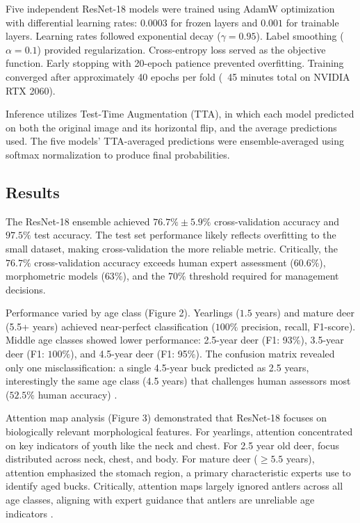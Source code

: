 \documentclass{iopjournal}
\begin{document}
Five independent ResNet-18 models were trained using AdamW optimization with differential learning rates: $0.0003$ for frozen layers and $0.001$ for trainable layers. Learning rates followed exponential decay ($\gamma=0.95$). Label smoothing ($\alpha=0.1$) provided regularization. Cross-entropy loss served as the objective function. Early stopping with 20-epoch patience prevented overfitting. Training converged after approximately 40 epochs per fold (~45 minutes total on NVIDIA RTX 2060).

Inference utilizes Test-Time Augmentation (TTA), in which each model predicted on both the original image and its horizontal flip, and the average predictions used. The five models' TTA-averaged predictions were ensemble-averaged using softmax normalization to produce final probabilities.

\subsection{Results}

The ResNet-18 ensemble achieved $76.7\% \pm 5.9\%$ cross-validation accuracy and $97.5\%$ test accuracy. The test set performance likely reflects overfitting to the small dataset, making cross-validation the more reliable metric. Critically, the $76.7\%$ cross-validation accuracy exceeds human expert assessment ($60.6\%$), morphometric models ($63\%$), and the $70\%$ threshold required for management decisions.

Performance varied by age class (Figure 2). Yearlings ($1.5$ years) and mature deer (5.5+ years) achieved near-perfect classification ($100\%$ precision, recall, F1-score). Middle age classes showed lower performance: 2.5-year deer (F1: 93\%), 3.5-year deer (F1: $100\%$), and 4.5-year deer (F1: 95\%). The confusion matrix revealed only one misclassification: a single 4.5-year buck predicted as 2.5 years, interestingly the same age class (4.5 years) that challenges human assessors most ($52.5\%$ human accuracy) \cite{2013gee}.

Attention map analysis (Figure 3) demonstrated that ResNet-18 focuses on biologically relevant morphological features. For yearlings, attention concentrated on key indicators of youth like the neck and chest. For 2.5 year old deer, focus distributed across neck, chest, and body. For mature deer ($\geq5.5$ years), attention emphasized the stomach region, a primary characteristic experts use to identify aged bucks. Critically, attention maps largely ignored antlers across all age classes, aligning with expert guidance that antlers are unreliable age indicators \cite{1999demarais, 2003richards}.
\end{document}
